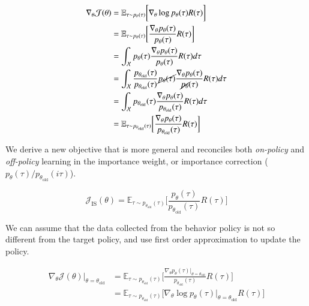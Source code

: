 \begin{equation}\label{eqn:derive-rl-objective-with-is}
    \begin{split}
        \nabla_{\theta}\mathcal{J}(\theta) &= \mathbb{E}_{\tau \sim p_{\theta}(\tau)}\bigg[ \nabla_{\theta}\log p_{\theta}(\tau) R(\tau)\bigg] \\
        &= \mathbb{E}_{\tau \sim p_{\theta}(\tau)} \bigg[ \frac{\nabla_{\theta}p_{\theta}(\tau)}{p_{\theta}(\tau)} R(\tau) \bigg] \\
        &= \int_{\mathcal{X}} p_{\theta}(\tau) \frac{\nabla_{\theta}p_{\theta}(\tau)}{p_{\theta}(\tau)} R(\tau) d\tau \\
        &= \int_{\mathcal{X}} \frac{p_{\theta_{\text{old}}}(\tau)}{p_{\theta_{\text{old}}}(\tau)} \cancel{p_{\theta}(\tau)} \frac{\nabla_{\theta}p_{\theta}(\tau)}{\cancel{p_{\theta}}(\tau)} R(\tau) d\tau \\
        &= \int_{\mathcal{X}} p_{\theta_{\text{old}}}(\tau) \frac{\nabla_{\theta}p_{\theta}(\tau)}{p_{\theta_{\text{old}}}(\tau)} R(\tau) d\tau \\
        &= \mathbb{E}_{\tau\sim p_{\theta_{\text{old}}}(\tau)} \bigg[\frac{\nabla_{\theta} p_{\theta}(\tau)}{p_{\theta_{\text{old}}}(\tau)} R(\tau)\bigg]
    \end{split}
\end{equation}

\noindent We derive a new objective that is more general and reconciles both \textit{on-policy} and \textit{off-policy} learning in the importance weight,
or importance correction ($p_{\theta}(\tau) / p_{\theta_{\text{old}}}(i\tau)$). 

\begin{equation}\label{eqn:rl-objective-with-is}
    \mathcal{J}_{\text{IS}}(\theta) = \mathbb{E}_{\tau\sim p_{\theta_{\text{old}}}(\tau)}\bigg[\frac{p_{\theta}(\tau)}{p_{\theta_{\text{old}}}(\tau)} R(\tau)\bigg]
\end{equation}

\noindent We can assume that the data collected from the behavior policy is
not so different from the target policy, and use first order approximation to
update the policy. 

\begin{equation}\label{eqn:rl-objective-is-linear-aprox}
    \begin{split}
        \nabla_{\theta}\mathcal{J}(\theta)\rvert_{\theta=\theta_{\text{old}}} &= \mathbb{E}_{\tau\sim p_{\theta_{\text{old}}}(\tau)} \bigg[\frac{\nabla_{\theta} p_{\theta}(\tau)\rvert_{\theta=\theta_{\text{old}}}}{p_{\theta_{\text{old}}}(\tau)} R(\tau)\bigg] \\
        &= \mathbb{E}_{\tau\sim p_{\theta_{\text{old}}}(\tau)} \big[\nabla_{\theta}\log p_{\theta}(\tau)\rvert_{\theta=\theta_{\text{old}}} R(\tau) \big]
    \end{split}
\end{equation}


